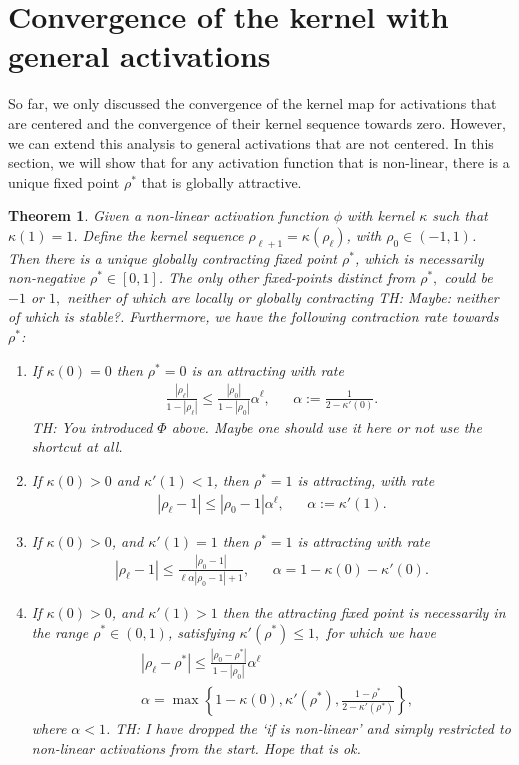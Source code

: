 \documentclass[twoside]{article}
\newtheorem{theorem}{Theorem}
\theoremstyle{definition}
\newcommand{\thomas}[1]{{\color{blue}TH:  \textit{#1}}}
\begin{document}
\section{Convergence of the kernel with general activations}
So far, we only discussed the convergence of the kernel map for activations that are centered and the convergence of their kernel sequence towards zero. However, we can extend this analysis to general activations that are not centered. In this section, we will show that for any activation function that is non-linear, there is a unique fixed point $\rho^*$ that is globally attractive.


\begin{theorem}
\label{thm:global_attract}
Given a non-linear activation function $\phi$ with kernel  $\kappa$ such that $\kappa(1)=1$. Define the kernel sequence $\rho_{\ell+1}=\kappa(\rho_\ell)$, with  $\rho_0 \in (-1,1)$. Then there is a unique globally contracting fixed point $\rho^*$, which is necessarily non-negative $\rho^*\in[0,1]$. The only other fixed-points distinct from $\rho^*,$ could be $-1$ or $1,$ neither of which are locally or globally contracting \thomas{Maybe: neither of which is stable?}. Furthermore, we have the following contraction rate towards $\rho^*$:
\begin{enumerate}
    \item If $\kappa(0)=0$ then $\rho^*=0$ is an attracting with rate 
    \begin{align*}
    \frac{|\rho_\ell|}{1-|\rho_\ell|} \le \frac{|\rho_0|}{1-|\rho_0|} \alpha^\ell, && \alpha:=\frac{1}{2-\kappa'(0)}.
    \end{align*}
    \thomas{You introduced $\Phi$ above. Maybe one should use it here or not use the shortcut at all.}
    \item If $\kappa(0)>0$ and $\kappa'(1)<1$, then $\rho^*=1$ is attracting, with rate 
    \begin{align*}
    |\rho_\ell-1| \le |\rho_0-1| \alpha ^\ell, && \alpha := \kappa'(1).
    \end{align*}
    \item If $\kappa(0) > 0$, and $\kappa'(1)=1$ then  $\rho^*=1$ is attracting with rate 
    \begin{align*}
    |\rho_\ell-1| \le \frac{|\rho_0-1|}{\ell\alpha|\rho_0-1|+1}, && \alpha = 1-\kappa(0)-\kappa'(0).
    \end{align*}
    \item If $\kappa(0) > 0$, and $\kappa'(1)>1$ then the attracting fixed point is necessarily in the range $\rho^*\in(0,1)$, satisfying $\kappa'(\rho^*)\le 1,$ for which we have  
    \begin{align*}
    &|\rho_\ell-\rho^*| \le \frac{|\rho_0-\rho^*|}{1-|\rho_0|}\alpha^\ell \\ &\alpha = \max\left\{1-\kappa(0),\kappa'(\rho^*),\frac{1-\rho^*}{2-\kappa'(\rho^*)}\right\},
    \end{align*}
    where $\alpha<1$.
    \thomas{I have dropped the `if is non-linear' and simply restricted to non-linear activations from the start. Hope that is ok.}
\end{enumerate}
\end{theorem}
\end{document}

